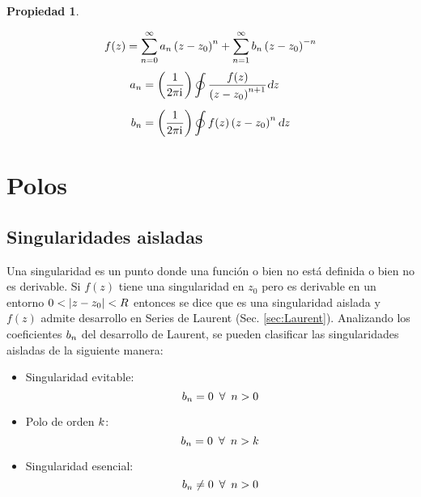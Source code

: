 \documentclass[a5paper,12pt,twoside]{book}
\newtheorem{prop}{{Propiedad}}[chapter]
\begin{document}
\begin{mdframed}[style=MyFrame1]
    \begin{prop}
    \end{prop}
    \begin{equation*}
        f(z) = \sum_{n=0}^\infty a_n \left(z-z_0\right)^n + \sum_{n=1}^\infty b_n \left(z-z_0\right)^{-n}
    \end{equation*}
    \begin{align*}
        a_n &= \left( \frac{1}{2\pi \mathrm{i}\mkern1mu} \right) \displaystyle\oint \frac{f(z)}{\left(z-z_0\right)^{n+1}} \textsl{d} z
        \\[1ex]
        b_n &= \left( \frac{1}{2\pi \mathrm{i}\mkern1mu} \right) \displaystyle\oint f(z) \left(z-z_0\right)^n \textsl{d} z
    \end{align*}
\end{mdframed}


\chapter{Polos}


\section{Singularidades aisladas}

Una singularidad es un punto donde una función o bien no está definida o bien no es derivable. Si $f(z)$ tiene una singularidad en $z_0$ pero es derivable en un entorno $0<{\left| {z-z_0} \right|}<R$ entonces se dice que es una singularidad aislada y $f(z)$ admite desarrollo en Series de Laurent (Sec. \ref{sec:Laurent}). Analizando los coeficientes $b_n$ del desarrollo de Laurent, se pueden clasificar las singularidades aisladas de la siguiente manera:

\begin{itemize}
    \item Singularidad evitable:
    \begin{equation*}
        b_n = 0 \enspace \forall \enspace n>0
    \end{equation*}
    \item Polo de orden $k$:
    \begin{equation*}
        b_n = 0 \enspace \forall \enspace n>k
    \end{equation*}
    \item Singularidad esencial:
    \begin{equation*}
        b_n \neq 0 \enspace \forall \enspace n>0
    \end{equation*}
\end{itemize}
\end{document}
